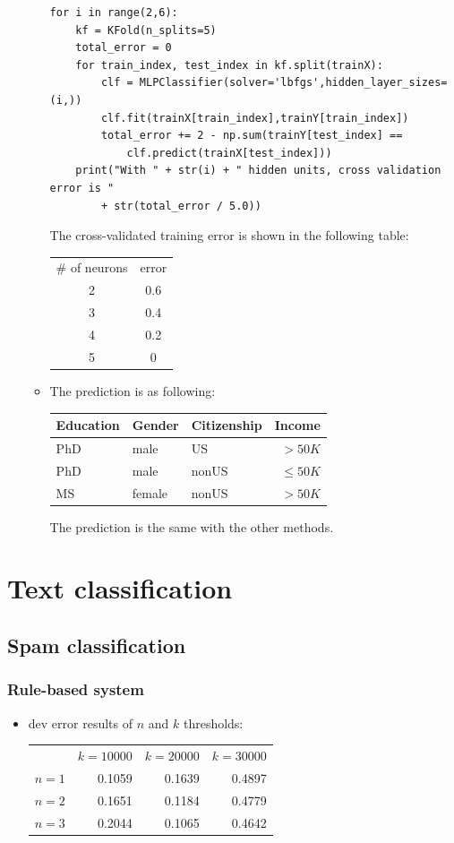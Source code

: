 \documentclass[11pt]{article}
\begin{document}
\begin{onehalfspace}
\begin{enumerate}[label=\alph*]
\begin{itemize}
\begin{verbatim}
for i in range(2,6):
	kf = KFold(n_splits=5)
	total_error = 0
	for train_index, test_index in kf.split(trainX):
		clf = MLPClassifier(solver='lbfgs',hidden_layer_sizes=(i,))
		clf.fit(trainX[train_index],trainY[train_index])
		total_error += 2 - np.sum(trainY[test_index] == 
			clf.predict(trainX[test_index]))
	print("With " + str(i) + " hidden units, cross validation error is "
		+ str(total_error / 5.0))
		\end{verbatim}
		The cross-validated training error is shown in the following table:\\
		\begin{tabular}{c | c}
		\# of neurons & error\\
		2 & 0.6 \\
		3 & 0.4 \\
		4 & 0.2 \\
		5 & 0\\
		\end{tabular}
		\item
		The prediction is as following:\\
		\begin{tabular}{| l | l | l | r |}
		\hline
		Education & Gender & Citizenship & Income \\ \hline
		PhD & male & US & $>50K$ \\ \hline
		PhD & male & nonUS & $\leq 50K$ \\ \hline
		MS & female & nonUS & $>50K$ \\ \hline
		\end{tabular}
		The prediction is the same with the other methods.
	\end{itemize}
\end{enumerate}
\section*{Text classification}
	\subsection*{Spam classification}
		\subsubsection*{Rule-based system}
		\begin{itemize}
			\item
			dev error results of $n$ and $k$ thresholds:\\
			\begin{tabular}{l | r | r | r}
			& $k=10000$ & $k=20000$ & $k=30000$\\
			$n=1$ & 0.1059 & 0.1639 & 0.4897\\
			$n=2$ & 0.1651 & 0.1184 & 0.4779\\
			$n=3$ & 0.2044 & 0.1065 & 0.4642\\
			\end{tabular}
		\end{itemize}

\end{onehalfspace}
\end{document}
